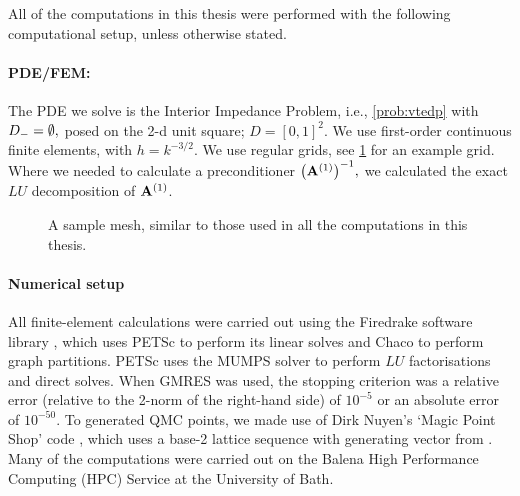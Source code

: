 All of the computations in this thesis were performed with the following computational setup, unless otherwise stated.

\paragraph{PDE/FEM:}
The PDE we solve is the Interior Impedance Problem, i.e., \cref{prob:vtedp} with $D_{-} = \emptyset,$ posed on the 2-d unit square; $D = [0,1]^2.$ We use first-order continuous finite elements, with $h = k^{-3/2}$. We use regular grids, see \cref{fig:grid} for an example grid. Where we needed to calculate a preconditioner $\AmatoI,$ we calculated the exact $LU$ decomposition of $\mathbf{A}^{(1)}$.

\begin{figure}[h]
  \centering
  
  \caption{A sample mesh, similar to those used in all the computations in this thesis.\label{fig:grid}}
  \end{figure}

\paragraph{Numerical setup}
All finite-element calculations were carried out using the Firedrake software library \cite{RaHaMiLaLuMcBeMaKe:16,LuVaRaBeRaHaKe:15}, which uses PETSc to perform its linear solves \cite{BaAbAsBrBrBuDaEiGrKaKnMaMcMiMuRuSaSmZaZhZh:18,BaGrMcSm:97,DaPaKlCo:11,BaAbAdBrBrBuDaDeEiGrKaKaKnMaMcMiMuRuSaSmZaZh:19} and Chaco \cite{HeLe:95} to perform graph partitions. PETSc uses the MUMPS \cite{AmDuLEKo:01,AmGuLEPr:06} solver to perform $LU$ factorisations and direct solves. When GMRES was used, the stopping criterion was a relative error (relative to the 2-norm of the right-hand side) of $10^{-5}$ or an absolute error of $10^{-50}.$ To generated QMC points, we made use of Dirk Nuyen's `Magic Point Shop' code \cite{Nu,KuNu:16}, which uses a base-2 lattice sequence with generating vector from \cite{CoKuNu:06}. Many of the computations were carried out on the Balena High Performance Computing (HPC) Service at the University of Bath.
